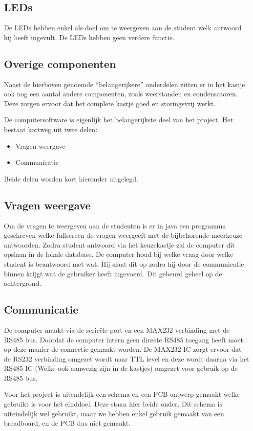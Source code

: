 \subsection*{LEDs}
De LEDs hebben enkel als doel om te weergeven aan de student welk antwoord hij heeft ingevult. De LEDs hebben geen verdere functie.

\subsection*{Overige componenten}
Naast de hierboven genoemde ``belangerijkere'' onderdelen zitten er in het kastje ook nog een aantal andere componenten, zoals weerstanden en condensatoren. Deze zorgen ervoor dat het complete kastje goed en storingsvrij werkt. 

De computersoftware is eigenlijk het belangerijkste deel van het project. Het bestaat kortweg uit twee delen:
\begin{itemize}
  \item Vragen weergave
  \item Communicatie
\end{itemize}
Beide delen worden kort hieronder uitgelegd.

\subsection*{Vragen weergave}
Om de vragen te weergeven aan de studenten is er in java een programma geschreven welke fullscreen de vragen weergeeft met de bijbehorende meerkeuze antwoorden. Zodra  student antwoord via het keuzekastje zal de computer dit opslaan in de lokale database. De computer houd bij welke vraag door welke student is beantwoord met wat. Hij slaat dit op zodra hij door de communicatie binnen krijgt wat de gebruiker heeft ingevoerd. Dit gebeurd geheel op de achtergrond.

\subsection*{Communicatie}
De computer maakt via de serie\"{e}le port en een MAX232 verbinding met de RS485 bus. Doordat de computer intern geen directe RS485 toegang heeft moet op deze manier de connectie gemaakt worden. De MAX232 IC zorgt ervoor dat de RS232 verbinding omgezet wordt naar TTL level en deze wordt daarna via het RS485 IC (Welke ook aanwezig zijn in de kastjes) omgezet voor gebruik op de RS485 bus.

Voor het project is uitendelijk een schema en een PCB ontwerp gemaakt welke gebruikt is voor het einddoel. Deze staan hier beide onder. Dit schema is uiteindelijk wel gebruikt, maar we hebben enkel gebruik gemaakt van een breadboard, en de PCB dus niet gemaakt.

\begin{center}
\end{center}

\begin{center}
\end{center}

